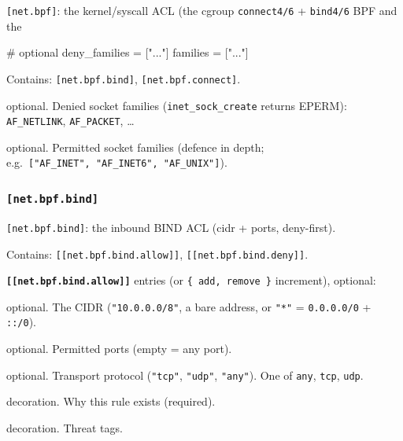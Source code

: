 \texttt{{[}net.bpf{]}}: the kernel/syscall ACL (the cgroup
\texttt{connect4/6} + \texttt{bind4/6} BPF and the

\begin{kennelcode}
# optional
deny_families = ["..."]
families = ["..."]
\end{kennelcode}

Contains: \texttt{{[}net.bpf.bind{]}}, \texttt{{[}net.bpf.connect{]}}.

\begin{description}
\tightlist
\item[\texttt{deny\_families}]
optional. Denied socket families (\texttt{inet\_sock\_create} returns
EPERM): \texttt{AF\_NETLINK}, \texttt{AF\_PACKET}, \ldots{}
\item[\texttt{families}]
optional. Permitted socket families (defence in depth;
e.g.~\texttt{{[}"AF\_INET",\ "AF\_INET6",\ "AF\_UNIX"{]}}).
\end{description}

\hypertarget{net.bpf.bind}{%
\subsubsection{\texorpdfstring{\texttt{{[}net.bpf.bind{]}}}{{[}net.bpf.bind{]}}}\label{net.bpf.bind}}

\texttt{{[}net.bpf.bind{]}}: the inbound BIND ACL (cidr + ports,
deny-first).

Contains: \texttt{{[}{[}net.bpf.bind.allow{]}{]}},
\texttt{{[}{[}net.bpf.bind.deny{]}{]}}.

\textbf{\texttt{{[}{[}net.bpf.bind.allow{]}{]}}} entries (or
\texttt{\{\ add,\ remove\ \}} increment), optional:

\begin{description}
\tightlist
\item[\texttt{cidr}]
optional. The CIDR (\texttt{"10.0.0.0/8"}, a bare address, or
\texttt{"*"} = \texttt{0.0.0.0/0} + \texttt{::/0}).
\item[\texttt{ports}]
optional. Permitted ports (empty = any port).
\item[\texttt{protocol}]
optional. Transport protocol (\texttt{"tcp"}, \texttt{"udp"},
\texttt{"any"}). One of \texttt{any}, \texttt{tcp}, \texttt{udp}.
\item[\texttt{reason}]
decoration. Why this rule exists (required).
\item[\texttt{threats}]
decoration. Threat tags.
\end{description}

